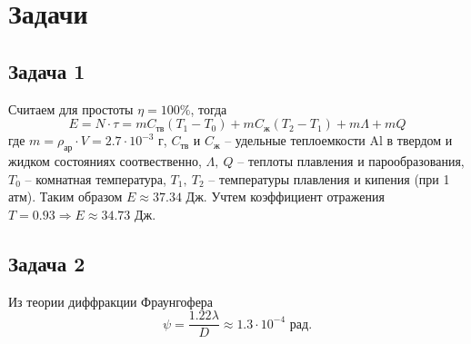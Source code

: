 \documentclass[a4paper, 12pt]{article}
\begin{document}
\section{Задачи}
\subsection*{Задача 1}
Считаем для простоты $\eta=100\%$, тогда
\begin{equation*}
	E=N\cdot\tau=mC_{\text{тв}}(T_1-T_0)+mC_{\text{ж}}(T_2-T_1)+m\Lambda+mQ
\end{equation*}
где $m=\rho_{\text{ар}}\cdot V=2.7\cdot10^{-3}$ г, $C_{\text{тв}}$ и $C_{\text{ж}}$ -- удельные теплоемкости Al в твердом и жидком состояниях соотвественно, $\Lambda,\ Q$ -- теплоты плавления и парообразования, $T_0$ -- комнатная температура, $T_1,\ T_2$ -- температуры плавления и кипения (при 1 атм). Таким образом $E\approx 37.34$ Дж. Учтем коэффициент отражения $T=0.93\Rightarrow E\approx 34.73$ Дж.
\subsection*{Задача 2}
Из теории диффракции Фраунгофера
\begin{equation*}
	\psi=\frac{1.22\lambda}{D}\approx 1.3\cdot 10^{-4}\text{ рад}.
\end{equation*}
\end{document}
